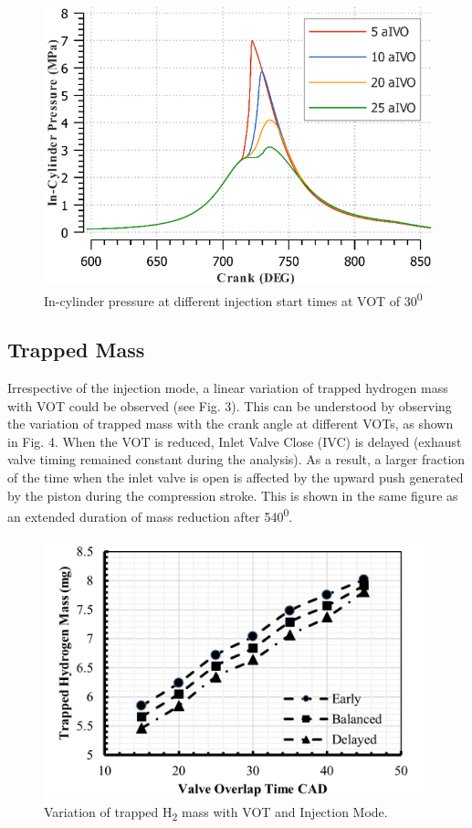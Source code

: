 \documentclass[conference]{IEEEtran}
\begin{document}
\begin{figure}[htbp]
    \centerline{\includegraphics{plots and graphs/2.png}}
    \caption{In-cylinder pressure at different injection start times at VOT of 30\textsuperscript{0}}
    \label{plt_2}
    \end{figure}


\subsection{Trapped Mass}
Irrespective of the injection mode, a linear variation of trapped hydrogen mass with VOT could be observed (see Fig. 3). This can be understood by observing the variation of trapped mass with the crank angle at different VOTs, as shown in Fig. 4. When the VOT is reduced, Inlet Valve Close (IVC) is delayed (exhaust valve timing remained constant during the analysis). As a result, a larger fraction of the time when the inlet valve is open is affected by the upward push generated by the piston during the compression stroke. This is shown in the same figure as an extended duration of mass reduction after 540\textsuperscript{0}.\\

\begin{figure}[htbp]
    \centerline{\includegraphics{plots and graphs/3.png}}
    \caption{Variation of trapped H\textsubscript{2} mass with VOT and Injection Mode.}
    \label{plt_3}
    \end{figure}
\end{document}
